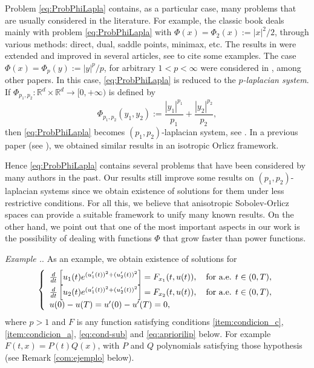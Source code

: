 \documentclass[twoside]{article}
\theoremstyle{remark}
\newcounter{example}[section]
\newenvironment{example}{\refstepcounter{example}\noindent\textit{Example \arabic{section}.\arabic{example}}.}{ }
\newcommand{\rr}{\mathbb{R}}
\begin{document}
  Problem \eqref{eq:ProbPhiLapla} contains, as a particular case, many problems that are usually considered in the literature.  For example, the classic book  \cite{mawhin2010critical} deals mainly with problem \eqref{eq:ProbPhiLapla} with $\Phi(x)=\Phi_2(x):=|x|^2/2$, through various methods: direct, dual, saddle points,  minimax, etc. The results in \cite{mawhin2010critical} were extended and improved in several articles,  see  \cite{tang1998periodic,tang2001periodic,tang1995periodic,wu1999periodic,zhao2004periodic}  to cite some examples. The case $\Phi(x)=\Phi_p(y):=|y|^p/p$, for arbitrary $1<p<\infty$ were considered in  \cite{tang2010periodic,Tian2007192}, among other papers. In this case, \eqref{eq:ProbPhiLapla} is reduced to the \emph{$p$-laplacian system}.  If $\Phi_{p_1,p_2}:\rr^d\times \rr^d\to [0,+\infty)$  is defined by
\begin{equation}\label{eq:phip_1p_2}\Phi_{p_1,p_2}(y_1,y_2):=\frac{|y_1|^{p_1}}{p_1}+\frac{|y_2|^{p_2}}{p_2},\end{equation}
then \eqref{eq:ProbPhiLapla} becomes  $(p_1,p_2)$-laplacian system, see
\cite{li2014periodic,pasca2010periodic,pacsca2010some,pasca2011some,pasca2016periodic,yang2012periodic,yang2013existence}.  In a previous paper (see \cite{ABGMS2015}), we obtained similar results in an isotropic Orlicz framework.


Hence \eqref{eq:ProbPhiLapla}  contains several problems that have been considered by many authors in the past. Our results still improve some results on $(p_1,p_2)$-laplacian systems since we obtain existence  of solutions for them under  less restrictive conditions.
For all this, we believe that anisotropic Sobolev-Orlicz spaces can provide a suitable framework to  unify many known results. On the other hand, we point out that one of the most important aspects in our work  is the possibility of dealing with  functions $\Phi$ that grow faster than power functions. 

\begin{example}\label{ex:RandEx} As an example, we obtain existence of solutions for 
\begin{equation}\label{eq:RandExample}
    \left\{%
\begin{array}{ll}
  \frac{d}{dt} \left[u_1(t)e^{(u_1'(t))^2+(u_2'(t))^2}\right]= F_{x_1}(t,u(t)), \quad \hbox{for a.e. } t \in (0,T),\\
   \frac{d}{dt} \left[u_2(t)e^{(u_1'(t))^2+(u_2'(t))^2}\right]= F_{x_2}(t,u(t)), \quad \hbox{for a.e. } t \in (0,T),\\
    u(0)-u(T)=u'(0)-u'(T)=0,
\end{array}%
\right. 
\end{equation}
where $p>1$ and $F$ is any function satisfying conditions \ref{item:condicion_c}, \ref{item:condicion_a}, \eqref{eq:cond-sub} and \eqref{eq:apriorilip} below. For example  $F(t,x)=P(t)Q(x)$, with $P$ and $Q$ polynomials satisfying those hypothesis (see Remark \ref{com:ejemplo} below).
\end{example}
\end{document}
